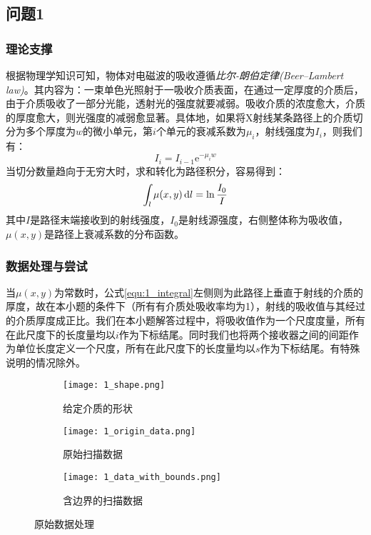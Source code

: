 \subsection{问题1}

\subsubsection{理论支撑}

根据物理学知识可知，物体对电磁波的吸收遵循\emph{比尔-朗伯定律(Beer–Lambert law)}。其内容为：一束单色光照射于一吸收介质表面，在通过一定厚度的介质后，由于介质吸收了一部分光能，透射光的强度就要减弱。吸收介质的浓度愈大，介质的厚度愈大，则光强度的减弱愈显著。具体地，如果将X射线某条路径上的介质切分为多个厚度为$w$的微小单元，第$i$个单元的衰减系数为$\mu_i$，射线强度为$I_i$，则我们有：
\begin{equation}\label{equ:1_law}
  I_i = I_{i-1}\mathrm{e}^{-\mu_{i}w}
\end{equation}
当切分数量趋向于无穷大时，求和转化为路径积分，容易得到：
\begin{equation}\label{equ:1_integral}
    \int_{l} \mu(x, y)\mathop{}\!\mathrm{d} l = \ln{\frac{I_0}{I}}
\end{equation}
其中$I$是路径末端接收到的射线强度，$I_0$是射线源强度，右侧整体称为吸收值，$\mu(x, y)$是路径上衰减系数的分布函数。

\subsubsection{数据处理与尝试}

当$\mu(x, y)$为常数时，公式\ref{equ:1_integral}左侧则为此路径上垂直于射线的介质的厚度，故在本小题的条件下（所有有介质处吸收率均为1），射线的吸收值与其经过的介质厚度成正比。我们在本小题解答过程中，将吸收值作为一个尺度度量，所有在此尺度下的长度量均以$i$作为下标结尾。同时我们也将两个接收器之间的间距作为单位长度定义一个尺度，所有在此尺度下的长度量均以$s$作为下标结尾。有特殊说明的情况除外。

\begin{figure}[htbp]
  \centering

  \begin{subfigure}[b]{0.3\textwidth}
    \texttt{[image: 1\_shape.png]}
    \caption{给定介质的形状}
    \label{fig:1_data_plots:shape}
  \end{subfigure}%
  \hfill
  \begin{subfigure}[b]{0.3\textwidth}
    \texttt{[image: 1\_origin\_data.png]}
    \caption{原始扫描数据}
    \label{fig:1_data_plots:orig_data}
  \end{subfigure}%
  \hfill
  \begin{subfigure}[b]{0.2\textwidth}
    \texttt{[image: 1\_data\_with\_bounds.png]}
    \caption{含边界的扫描数据}
    \label{fig:1_data_plots:orig_data_with_bounds}
  \end{subfigure}

  \caption{原始数据处理}
  \label{fig:1_data_plots} %
\end{figure}

